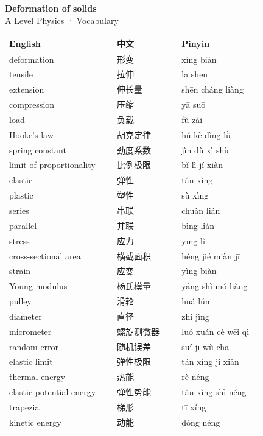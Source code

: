 \documentclass[11pt]{article}
\begin{document}
\begin{center}
  {\LARGE\bfseries Deformation of solids}\\[0.35em]
  {\large A Level Physics · Vocabulary}
\end{center}
\vspace{0.6em}

\begin{longtable}{@{}p{0.40\linewidth}p{0.24\linewidth}p{0.30\linewidth}@{}}
\toprule
\textbf{English} & \textbf{中文} & \textbf{Pinyin} \\
\midrule
\endhead
\bottomrule
\endlastfoot
deformation & 形变 & xíng biàn \\
tensile & 拉伸 & lā shēn \\
extension & 伸长量 & shēn cháng liàng \\
compression & 压缩 & yā suō \\
load & 负载 & fù zài \\
Hooke's law & 胡克定律 & hú kè dìng lǜ \\
spring constant & 劲度系数 & jìn dù xì shù \\
limit of proportionality & 比例极限 & bǐ lì jí xiàn \\
elastic & 弹性 & tán xìng \\
plastic & 塑性 & sù xìng \\
series & 串联 & chuàn lián \\
parallel & 并联 & bìng lián \\
stress & 应力 & yīng lì \\
cross-sectional area & 横截面积 & héng jié miàn jī \\
strain & 应变 & yìng biàn \\
Young modulus & 杨氏模量 & yáng shì mó liàng \\
pulley & 滑轮 & huá lún \\
diameter & 直径 & zhí jìng \\
micrometer & 螺旋测微器 & luó xuán cè wēi qì \\
random error & 随机误差 & suí jī wù chā \\
elastic limit & 弹性极限 & tán xìng jí xiàn \\
thermal energy & 热能 & rè néng \\
elastic potential energy & 弹性势能 & tán xìng shì néng \\
trapezia & 梯形 & tī xíng \\
kinetic energy & 动能 & dòng néng \\
\end{longtable}
\end{document}
